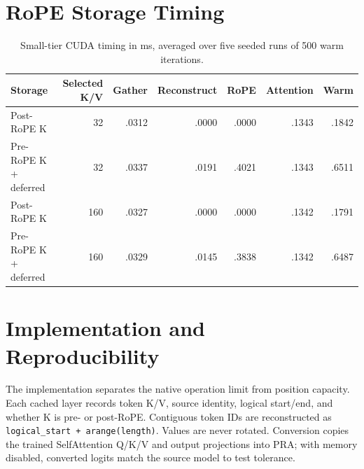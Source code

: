 \documentclass[11pt]{article}
\begin{document}
\section{RoPE Storage Timing}

\begin{table}[H]
\centering
\small
\caption{Small-tier CUDA timing in ms, averaged over five seeded runs of 500 warm iterations.}
\label{tab:timing-detail}
\begin{tabular}{lrrrrrr}
\toprule
Storage & Selected K/V & Gather & Reconstruct & RoPE & Attention & Warm \\
\midrule
Post-RoPE K & 32  & .0312 & .0000 & .0000 & .1343 & .1842 \\
Pre-RoPE K + deferred & 32  & .0337 & .0191 & .4021 & .1343 & .6511 \\
Post-RoPE K & 160 & .0327 & .0000 & .0000 & .1342 & .1791 \\
Pre-RoPE K + deferred & 160 & .0329 & .0145 & .3838 & .1342 & .6487 \\
\bottomrule
\end{tabular}
\end{table}

\section{Implementation and Reproducibility}

The implementation separates the native operation limit from position capacity. Each cached
layer records token K/V, source identity, logical start/end, and whether K is pre- or
post-RoPE. Contiguous token IDs are reconstructed as
\texttt{logical\_start + arange(length)}. Values are never rotated. Conversion copies the
trained SelfAttention Q/K/V and output projections into PRA; with memory disabled, converted
logits match the source model to test tolerance.
\end{document}
